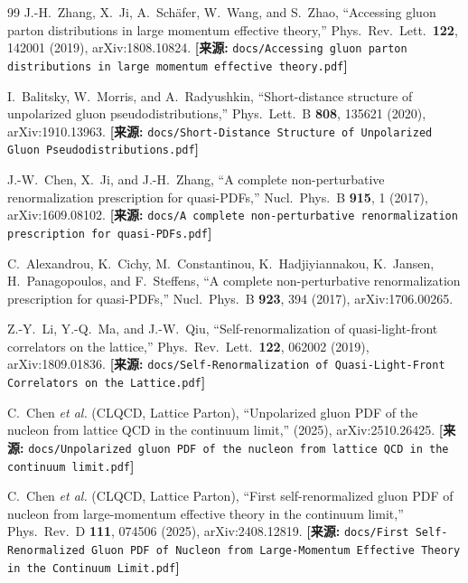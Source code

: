 \documentclass[12pt,a4paper]{ctexart}
\theoremstyle{definition}
\begin{document}
\begin{thebibliography}{99}
J.-H.~Zhang, X.~Ji, A.~Sch\"afer, W.~Wang, and S.~Zhao,
``Accessing gluon parton distributions in large momentum effective theory,''
Phys.\ Rev.\ Lett.\ \textbf{122}, 142001 (2019), arXiv:1808.10824.
\quad\textbf{[来源:} \texttt{docs/Accessing gluon parton distributions in large momentum effective theory.pdf}\textbf{]}

I.~Balitsky, W.~Morris, and A.~Radyushkin,
``Short-distance structure of unpolarized gluon pseudodistributions,''
Phys.\ Lett.\ B \textbf{808}, 135621 (2020), arXiv:1910.13963.
\quad\textbf{[来源:} \texttt{docs/Short-Distance Structure of Unpolarized Gluon Pseudodistributions.pdf}\textbf{]}

J.-W.~Chen, X.~Ji, and J.-H.~Zhang,
``A complete non-perturbative renormalization prescription for quasi-PDFs,''
Nucl.\ Phys.\ B \textbf{915}, 1 (2017), arXiv:1609.08102.
\quad\textbf{[来源:} \texttt{docs/A complete non-perturbative renormalization prescription for quasi-PDFs.pdf}\textbf{]}

C.~Alexandrou, K.~Cichy, M.~Constantinou, K.~Hadjiyiannakou, K.~Jansen, H.~Panagopoulos, and F.~Steffens,
``A complete non-perturbative renormalization prescription for quasi-PDFs,''
Nucl.\ Phys.\ B \textbf{923}, 394 (2017), arXiv:1706.00265.

Z.-Y.~Li, Y.-Q.~Ma, and J.-W.~Qiu,
``Self-renormalization of quasi-light-front correlators on the lattice,''
Phys.\ Rev.\ Lett.\ \textbf{122}, 062002 (2019), arXiv:1809.01836.
\quad\textbf{[来源:} \texttt{docs/Self-Renormalization of Quasi-Light-Front Correlators on the Lattice.pdf}\textbf{]}


C.~Chen \textit{et al.} (CLQCD, Lattice Parton),
``Unpolarized gluon PDF of the nucleon from lattice QCD in the continuum limit,''
(2025), arXiv:2510.26425.
\quad\textbf{[来源:} \texttt{docs/Unpolarized gluon PDF of the nucleon from lattice QCD in the continuum limit.pdf}\textbf{]}

C.~Chen \textit{et al.} (CLQCD, Lattice Parton),
``First self-renormalized gluon PDF of nucleon from large-momentum effective theory in the continuum limit,''
Phys.\ Rev.\ D \textbf{111}, 074506 (2025), arXiv:2408.12819.
\quad\textbf{[来源:} \texttt{docs/First Self-Renormalized Gluon PDF of Nucleon from Large-Momentum Effective Theory in the Continuum Limit.pdf}\textbf{]}


\end{thebibliography}
\end{document}
